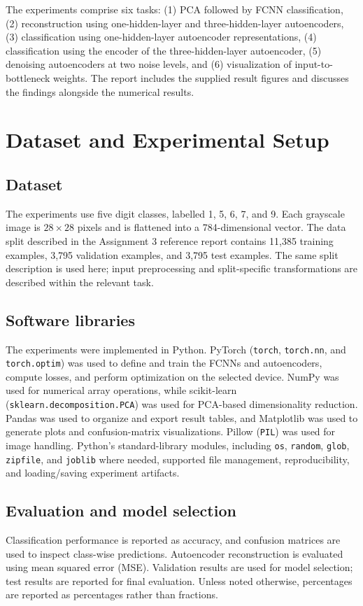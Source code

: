 \documentclass[conference,onecolumn]{IEEEtran}
\begin{document}
The experiments comprise six tasks: (1) PCA followed by FCNN classification, (2) reconstruction using one-hidden-layer and three-hidden-layer autoencoders, (3) classification using one-hidden-layer autoencoder representations, (4) classification using the encoder of the three-hidden-layer autoencoder, (5) denoising autoencoders at two noise levels, and (6) visualization of input-to-bottleneck weights. The report includes the supplied result figures and discusses the findings alongside the numerical results.

\section{Dataset and Experimental Setup}
\subsection{Dataset}
The experiments use five digit classes, labelled 1, 5, 6, 7, and 9. Each grayscale image is $28\times28$ pixels and is flattened into a 784-dimensional vector. The data split described in the Assignment 3 reference report contains 11,385 training examples, 3,795 validation examples, and 3,795 test examples. The same split description is used here; input preprocessing and split-specific transformations are described within the relevant task.


\subsection{Software libraries}
The experiments were implemented in Python. PyTorch (\texttt{torch},
\texttt{torch.nn}, and \texttt{torch.optim}) was used to define and train the
FCNNs and autoencoders, compute losses, and perform optimization on the selected
device. NumPy was used for numerical array operations, while
scikit-learn (\texttt{sklearn.decomposition.PCA}) was used for PCA-based
dimensionality reduction. Pandas was used to organize and export result tables,
and Matplotlib was used to generate plots and confusion-matrix visualizations.
Pillow (\texttt{PIL}) was used for image handling. Python's standard-library
modules, including \texttt{os}, \texttt{random}, \texttt{glob},
\texttt{zipfile}, and \texttt{joblib} where needed, supported file management,
reproducibility, and loading/saving experiment artifacts.

\subsection{Evaluation and model selection}
Classification performance is reported as accuracy, and confusion matrices are used to inspect class-wise predictions. Autoencoder reconstruction is evaluated using mean squared error (MSE). Validation results are used for model selection; test results are reported for final evaluation. Unless noted otherwise, percentages are reported as percentages rather than fractions.
\end{document}
